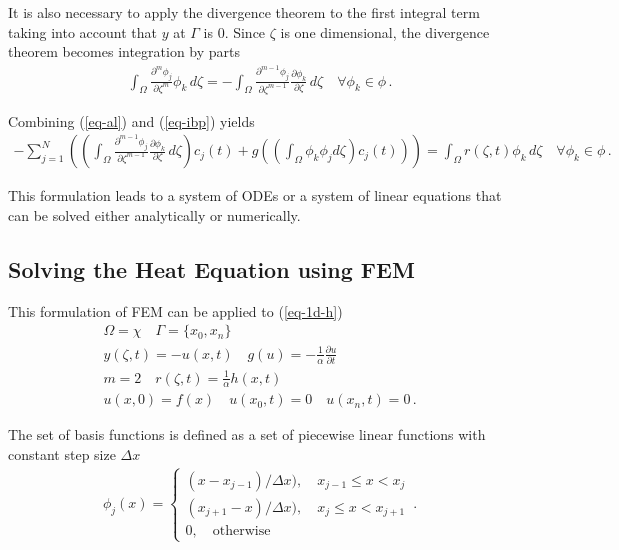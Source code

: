 It is also necessary to apply the divergence theorem to the first integral term taking into account that \(y\) at \(\Gamma\) is 0.
Since \(\zeta\) is one dimensional, the divergence theorem becomes integration by parts
\begin{gather}
\int_{\Omega} \frac{\partial^{m} \phi_{j}}{\partial \zeta^{m}} \phi_{k} \, d\zeta = - \int_{\Omega} \frac{\partial^{m-1} \phi_{j}}{\partial \zeta^{m-1}} \frac{\partial \phi_{k}}{\partial \zeta} \, d\zeta \quad \forall \phi_{k} \in \phi \,. \label{eq-ibp}
\end{gather}


Combining (\ref{eq-al}) and (\ref{eq-ibp}) yields
\begin{gather}
-\sum_{j = 1}^{N} \left(\left(\int_{\Omega} \frac{\partial^{m-1} \phi_{j}}{\partial \zeta^{m-1}} \frac{\partial \phi_{k}}{\partial \zeta} \, d\zeta\right) c_{j}(t) + g\left(\left(\int_{\Omega} \phi_k \phi_j d\zeta\right) c_{j}(t)\right)\right)  = \int_{\Omega}  r(\zeta, t) \phi_{k}        \, d\zeta \quad \forall \phi_{k} \in \phi \,. \label{eq-fem}
\end{gather}


This formulation leads to a system of ODEs or a system of linear equations that can be solved either analytically or numerically.
\subsection{Solving the Heat Equation using FEM}
This formulation of FEM can be applied to (\ref{eq-1d-h})
\begin{gather}
\Omega = \chi \quad \Gamma = \{x_{0}, x_{n}\} \\
y(\zeta, t) = -u(x, t) \quad g(u) = -\frac{1}{\alpha} \frac{\partial u}{\partial t} \\
m = 2 \quad r(\zeta, t) = \frac{1}{\alpha} h(x,t) \\
u(x, 0) = f(x) \quad u(x_{0}, t) = 0 \quad u(x_{n}, t) = 0 \,.
\end{gather}


The set of basis functions is defined as a set of piecewise linear functions with constant step size \(\Delta x\)
\begin{gather}
    \phi_j(x)= 
\begin{cases}
    (x - x_{j-1}) / \Delta x), \quad x_{j-1} \leq x <  x_{j}\\
    (x_{j+1} - x) / \Delta x), \quad x_{j} \leq x <  x_{j + 1}\\
    0,              \quad \text{otherwise}
\end{cases} \,.
\end{gather}
\cite{Gustafsson2011d}



